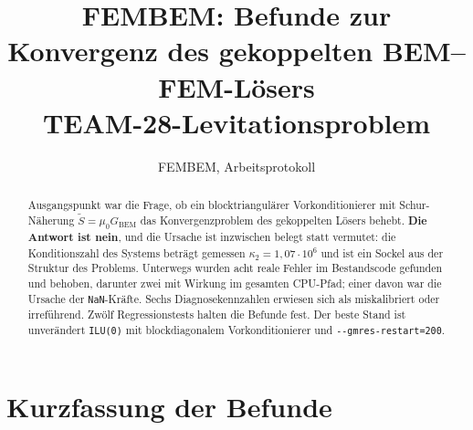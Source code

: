 \documentclass[11pt,a4paper]{article}
\title{FEMBEM: Befunde zur Konvergenz des gekoppelten BEM--FEM-Lösers\\
\large TEAM-28-Levitationsproblem}
\author{FEMBEM, Arbeitsprotokoll}
\date{}
\newcommand{\code}[1]{\texttt{\small #1}}
\newcommand{\kappazwei}{\kappa_2}
\begin{document}
\maketitle

\begin{abstract}
\noindent
Ausgangspunkt war die Frage, ob ein blocktriangulärer Vorkonditionierer mit
Schur-Näherung $\tilde S = \mu_0 G_{\mathrm{BEM}}$ das Konvergenzproblem des
gekoppelten Lösers behebt. \textbf{Die Antwort ist nein}, und die Ursache ist
inzwischen belegt statt vermutet: die Konditionszahl des Systems beträgt
gemessen $\kappazwei = 1{,}07\cdot10^{6}$ und ist ein Sockel aus der Struktur
des Problems. Unterwegs wurden acht reale Fehler im Bestandscode gefunden und
behoben, darunter zwei mit Wirkung im gesamten CPU-Pfad; einer davon war die
Ursache der \code{NaN}-Kräfte. Sechs Diagnosekennzahlen erwiesen sich als
miskalibriert oder irreführend. Zwölf Regressionstests halten die Befunde fest.
Der beste Stand ist unverändert \code{ILU(0)} mit blockdiagonalem
Vorkonditionierer und \code{-{}-gmres-restart=200}.
\end{abstract}

\tableofcontents

\section{Kurzfassung der Befunde}
\end{document}
